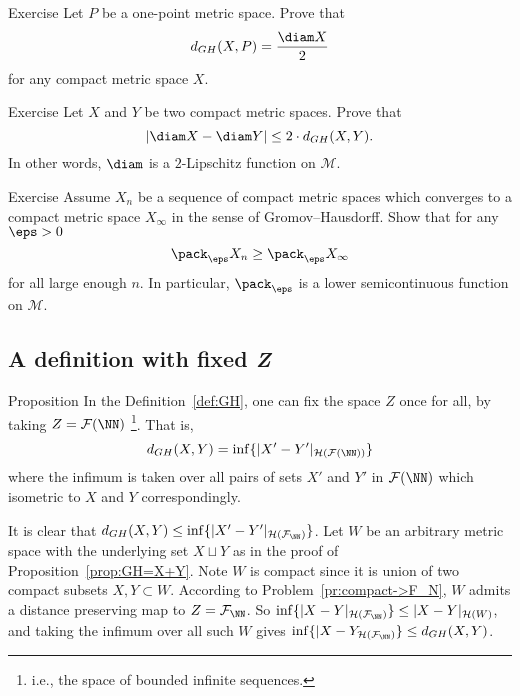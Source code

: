 \begin{thm}{Exercise}\label{ex:point-diam}
Let $P$ be a one-point metric space. 
Prove that 
$$d_{GH} (X, P ) = \frac{\diam X}2$$ for any compact metric space $X$.
\end{thm}

\begin{thm}{Exercise}\label{ex:d_GH-and-diam}
 Let $X$ and $Y$ be two compact metric spaces.
Prove that 
$$|\diam X - \diam Y |\le 2\cdot d_{GH} (X, Y ).$$
In other words, $\diam$ is a $2$-Lipschitz function on $\mathcal{M}$.
\end{thm}

\begin{thm}{Exercise}\label{ex:pack-GH}
Assume $X_n$ be a sequence of compact metric spaces which converges to a compact metric space $X_\infty$
in the sense of Gromov--Hausdorff.
Show that for any $\eps>0$
$$\pack_\eps X_n\ge\pack_\eps X_\infty$$ 
for all large enough $n$.
In particular, $\pack_\eps$ is a lower semicontinuous function on $\mathcal{M}$.
\end{thm}

\subsection*{A definition with fixed \textit{Z}}

\begin{thm}{Proposition}\label{prop:GH-with-fixed-Z}
In the Definition~\ref{def:GH}, 
one can fix the space $Z$ once for all, by taking $Z=\mathcal{F}(\NN)$%
\footnote{i.e., the space of bounded infinite sequences.}.  
That is, 
$$d_{GH}(X,Y) = \inf \{|X'-Y'|_{\mathcal{H}(\mathcal{F}(\NN))}\}$$ 
where the infimum is taken over all pairs of sets $X'$ and $Y'$ in $\mathcal{F}(\NN)$
which isometric to  $X$ and $Y$ correspondingly.  
\end{thm}

It is clear that $d_{GH}(X,Y) \leq \inf \{|X'-Y'|_{\mathcal{H}(\mathcal{F}_\NN)}\}$.  
Let $W$ be an arbitrary metric space with the underlying set $X\sqcup Y$ as in the proof of Proposition~\ref{prop:GH=X+Y}.
Note $W$ is compact since it is union of two compact subsets $X,Y\subset W$.
According to Problem~\ref{pr:compact->F_N},
$W$ admits a distance preserving map to $Z=\mathcal{F}_\NN$.
So $\inf \{|X-Y|_{\mathcal{H}(\mathcal{F}_\NN)}\} \leq |X-Y|_{\mathcal{H}(W)}$, and taking the infimum over all such $W$ gives $\inf \{|X-Y_{\mathcal{H}(\mathcal{F}_\NN)}\} \leq d_{GH}(X,Y)$.
\qeds

